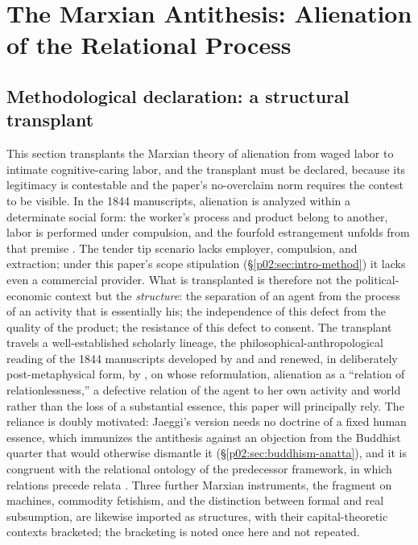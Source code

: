 \documentclass[11pt,a4paper]{article}
\begin{document}
\section{The Marxian Antithesis: Alienation of the Relational Process}
\label{p02:sec:marx}

\subsection{Methodological declaration: a structural transplant}
\label{p02:sec:marx-method}

This section transplants the Marxian theory of alienation from waged labor to intimate cognitive-caring labor, and the transplant must be declared, because its legitimacy is contestable and the paper's no-overclaim norm requires the contest to be visible. In the 1844 manuscripts, alienation is analyzed within a determinate social form: the worker's process and product belong to another, labor is performed under compulsion, and the fourfold estrangement unfolds from that premise \parencite{marx1844economic}. The tender tip scenario lacks employer, compulsion, and extraction; under this paper's scope stipulation (\S\ref{p02:sec:intro-method}) it lacks even a commercial provider. What is transplanted is therefore not the political-economic context but the \emph{structure}: the separation of an agent from the process of an activity that is essentially his; the independence of this defect from the quality of the product; the resistance of this defect to consent. The transplant travels a well-established scholarly lineage, the philosophical-anthropological reading of the 1844 manuscripts developed by \textcite{fromm1961marx} and \textcite{ollman1971alienation} and renewed, in deliberately post-metaphysical form, by \textcite{jaeggi2014alienation}, on whose reformulation, alienation as a ``relation of relationlessness,'' a defective relation of the agent to her own activity and world rather than the loss of a substantial essence, this paper will principally rely. The reliance is doubly motivated: Jaeggi's version needs no doctrine of a fixed human essence, which immunizes the antithesis against an objection from the Buddhist quarter that would otherwise dismantle it (\S\ref{p02:sec:buddhism-anatta}), and it is congruent with the relational ontology of the predecessor framework, in which relations precede relata \parencite{huang2025relational}. Three further Marxian instruments, the fragment on machines, commodity fetishism, and the distinction between formal and real subsumption, are likewise imported as structures, with their capital-theoretic contexts bracketed; the bracketing is noted once here and not repeated.
\end{document}
